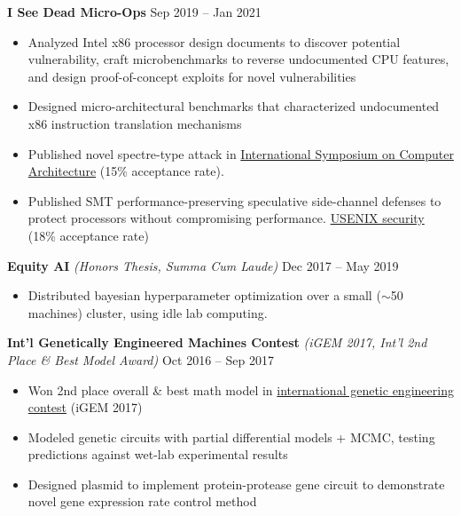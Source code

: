 \documentclass[10pt,letterpaper]{article}
\begin{document}
\vspace{3pt}
\textbf{I See Dead Micro-Ops} \hfill Sep 2019 -- Jan 2021
\begin{itemize}
    \item Analyzed Intel x86 processor design documents to discover potential vulnerability, craft microbenchmarks to reverse undocumented CPU features, and design proof-of-concept exploits for novel vulnerabilities
    \item Designed micro-architectural benchmarks that characterized undocumented x86 instruction translation mechanisms
    \item Published novel spectre-type attack in \href{https://ieeexplore.ieee.org/document/9499837}{International Symposium on Computer Architecture} (15\% acceptance rate).
    \item Published SMT performance-preserving speculative side-channel defenses to protect processors without compromising performance. \href{https://www.usenix.org/conference/usenixsecurity22/presentation/taram}{USENIX security} (18\% acceptance rate)
\end{itemize}

\vspace{3pt}
\textbf{Equity AI} \textit{(Honors Thesis, Summa Cum Laude)} \hfill Dec 2017 -- May 2019
\begin{itemize}
    \item Distributed bayesian hyperparameter optimization over a small ($\sim$50 machines) cluster, using idle lab computing.
\end{itemize}

\vspace{3pt}
\textbf{Int'l Genetically Engineered Machines Contest} \textit{(iGEM 2017, Int'l 2nd Place \& Best Model Award)} \hfill Oct 2016 -- Sep 2017
\begin{itemize}
    \item Won 2nd place overall \& best math model in \href{https://2017.igem.org/Team:William_and_Mary/Speed_Control}{international genetic engineering contest} (iGEM 2017)
    \item Modeled genetic circuits with partial differential models + MCMC, testing predictions against wet-lab experimental results
    \item Designed plasmid to implement protein-protease gene circuit to demonstrate novel gene expression rate control method
\end{itemize}
\end{document}
